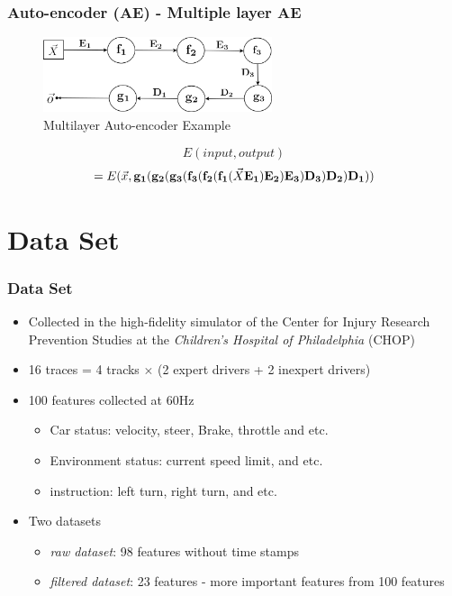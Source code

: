 \documentclass{beamer}
\begin{document}
\begin{frame}
\frametitle{Auto-encoder (AE) - Multiple layer AE}
\begin{figure}[t!]
    \centering
    \includegraphics[width=0.6\textwidth]{../paper/pictures/figures/example_MAE.png}
    \caption{Multilayer Auto-encoder Example}
    \label{fig:example_MAE}
\end{figure}

$$E(input, output)$$
$$=E(\vec{x}, \bold{g_1}(\bold{g_2}(\bold{g_3}(\bold{f_3}(\bold{f_2}(\bold{f_1}(\vec{X}\bold{E_1})\bold{E_2})\bold{E_3})\bold{D_3})\bold{D_2})\bold{D_1}))$$
\end{frame}


\section{Data Set}
\begin{frame}
\frametitle{Data Set}
\begin{itemize}
\item Collected in the high-fidelity simulator of the Center for Injury Research Prevention Studies at the \textit{Children's Hospital of Philadelphia} (CHOP)
\item 16 traces = 4 tracks $\times$ (2 expert drivers + 2 inexpert drivers)
\item 100 features collected at 60Hz
	\begin{itemize}
	\item Car status: velocity, steer, Brake, throttle and etc.
	\item Environment status: current speed limit, and etc.
	\item instruction: left turn, right turn, and etc.
	\end{itemize}
\item Two datasets
	\begin{itemize}
	\item {\em raw dataset}: 98 features without time stamps
	\item {\em filtered dataset}: 23 features - more important features from 100 features
	\end{itemize}
\end{itemize}

\end{frame}
\end{document}
